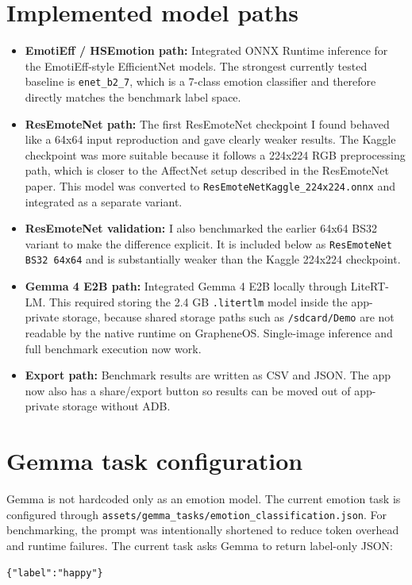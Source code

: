 \documentclass[11pt,a4paper]{article}
\begin{document}
\section*{Implemented model paths}
\begin{itemize}[leftmargin=*]
  \item \textbf{EmotiEff / HSEmotion path:} Integrated ONNX Runtime inference for the EmotiEff-style EfficientNet models. The strongest currently tested baseline is \texttt{enet\_b2\_7}, which is a 7-class emotion classifier and therefore directly matches the benchmark label space.
  \item \textbf{ResEmoteNet path:} The first ResEmoteNet checkpoint I found behaved like a 64x64 input reproduction and gave clearly weaker results. The Kaggle checkpoint was more suitable because it follows a 224x224 RGB preprocessing path, which is closer to the AffectNet setup described in the ResEmoteNet paper. This model was converted to \texttt{ResEmoteNetKaggle\_224x224.onnx} and integrated as a separate variant.
  \item \textbf{ResEmoteNet validation:} I also benchmarked the earlier 64x64 BS32 variant to make the difference explicit. It is included below as \texttt{ResEmoteNet BS32 64x64} and is substantially weaker than the Kaggle 224x224 checkpoint.
  \item \textbf{Gemma 4 E2B path:} Integrated Gemma 4 E2B locally through LiteRT-LM. This required storing the 2.4 GB \texttt{.litertlm} model inside the app-private storage, because shared storage paths such as \texttt{/sdcard/Demo} are not readable by the native runtime on GrapheneOS. Single-image inference and full benchmark execution now work.
  \item \textbf{Export path:} Benchmark results are written as CSV and JSON. The app now also has a share/export button so results can be moved out of app-private storage without ADB.
\end{itemize}

\section*{Gemma task configuration}
Gemma is not hardcoded only as an emotion model. The current emotion task is configured through \texttt{assets/gemma\_tasks/emotion\_classification.json}. For benchmarking, the prompt was intentionally shortened to reduce token overhead and runtime failures. The current task asks Gemma to return label-only JSON:

\begin{verbatim}
{"label":"happy"}
\end{verbatim}
\end{document}
